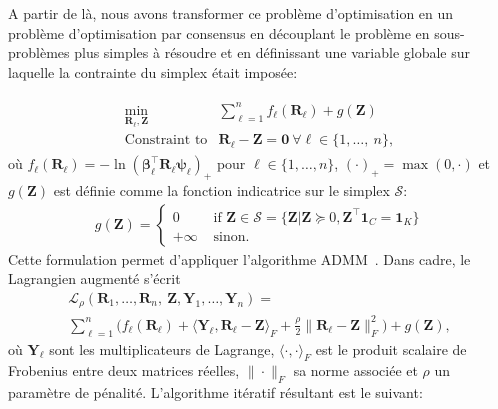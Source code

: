 A partir de là, nous avons transformer ce problème d'optimisation en un problème d'optimisation par consensus en découplant le problème en sous-problèmes plus simples à résoudre et en définissant une variable globale sur laquelle la contrainte du simplex était imposée:

\begin{eqnarray}
  \label{eq:consensus}
   \begin{array}{rl}
     \displaystyle{\min_{\mathbf{R}_\ell,\mathbf{Z}}} & \displaystyle{\sum_{\ell = 1}^{n}f_\ell(\mathbf{R}_\ell)} + g(\mathbf{Z})\\
     \text{Constraint to} & \mathbf{R}_\ell - \mathbf{Z} = \mathbf{0}\ \forall \ell\in\{1,\ldots,\ n\},
   \end{array}
\end{eqnarray}
où \(f_\ell(\mathbf{R}_\ell)  = -\ln(\boldsymbol{\beta}_\ell^\top\mathbf{R}_\ell\boldsymbol{\psi}_\ell)_{+}\) pour \(\ell\in \{1,\ldots,n\}\), \((\cdot)_{+}=\max(0, \cdot)\) et \(g(\mathbf{Z})\) est définie comme la fonction indicatrice sur le simplex \(\mathcal{S}\):
\begin{eqnarray}
  g(\mathbf{Z})  =  \left\{
                      \begin{array}{rl}
                        0 & \text{ if } \mathbf{Z}\in\mathcal{S} = \{\mathbf{Z}|\mathbf{Z}\succcurlyeq 0, \mathbf{Z}^\top\mathbf{1}_C = \mathbf{1}_{K}\} \\
                        +\infty & \text{ sinon.} 
                      \end{array}
                                  \right.                                  \label{eq:simplex}
\end{eqnarray}
Cette formulation permet d'appliquer l'algorithme ADMM~\cite[Chapter~7]{boyd-2010-distr-optim}. Dans cadre, le Lagrangien augmenté s'écrit
\begin{multline}
  \mathcal{L}_{\rho}(\mathbf{R}_1,\ldots,\mathbf{R}_n,\ \mathbf{Z},\mathbf{Y}_1,\ldots,\mathbf{Y}_n) = \\ \sum_{\ell=1}^{n} \Bigg(f_{\ell}(\mathbf{R}_\ell) + \langle\mathbf{Y}_\ell, \mathbf{R}_\ell - \mathbf{Z}\rangle_F + \frac{\rho}{2}\|\mathbf{R}_\ell - \mathbf{Z}\|^2_F\Bigg) + g(\mathbf{Z}),
  \label{eq:consensus:lagrangian}  
\end{multline}
où \(\mathbf{Y}_\ell\) sont les multiplicateurs de Lagrange, \(\langle\cdot,\cdot\rangle_F\) est le produit scalaire de Frobenius entre deux matrices réelles, \(\|\cdot\|_F\) sa norme associée et \(\rho\) un paramètre de pénalité. L'algorithme itératif résultant est le suivant:
